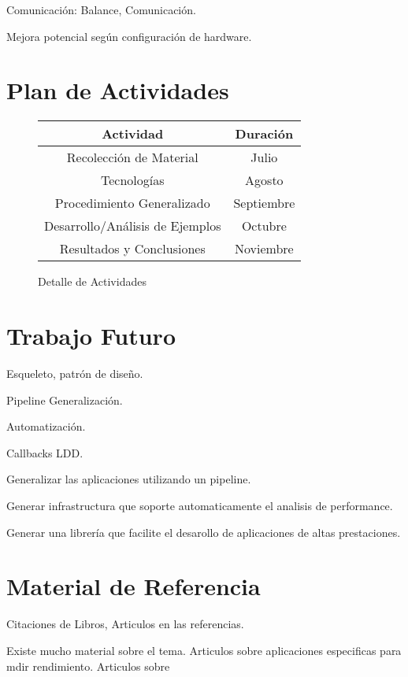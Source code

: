 \documentclass[a4paper,twocolumn]{article}
\begin{document}
Comunicaci\'on: Balance, Comunicaci\'on.

Mejora potencial seg\'un configuraci\'on de hardware.

\section{Plan de Actividades}

\begin{figure}[H]
  \begin{center}
    \begin{tabular}{|c|c|}\hline
      {\bf Actividad} & {\bf Duraci\'on} \\ \hline
      Recolecci\'on de Material & Julio \\ \hline
      Tecnolog\'ias & Agosto \\ \hline
      Procedimiento Generalizado & Septiembre \\ \hline
      Desarrollo/An\'alisis de Ejemplos & Octubre \\ \hline
      Resultados y Conclusiones & Noviembre \\ \hline
    \end{tabular}
    \caption{Detalle de Actividades}
  \end{center}
  \label{schedule}
\end{figure}

\section{Trabajo Futuro}

Esqueleto, patr\'on de dise\~no.

Pipeline Generalizaci\'on.

Automatizaci\'on.

Callbacks LDD.

Generalizar las aplicaciones utilizando un pipeline.

Generar infrastructura que soporte automaticamente el analisis de performance.

Generar una librer\'ia que facilite el desarollo de aplicaciones de altas prestaciones.

\section{Material de Referencia}

Citaciones de Libros, Articulos en las referencias.

Existe mucho material sobre el tema.
Articulos sobre aplicaciones especificas para mdir rendimiento.
Articulos sobre 
\end{document}

